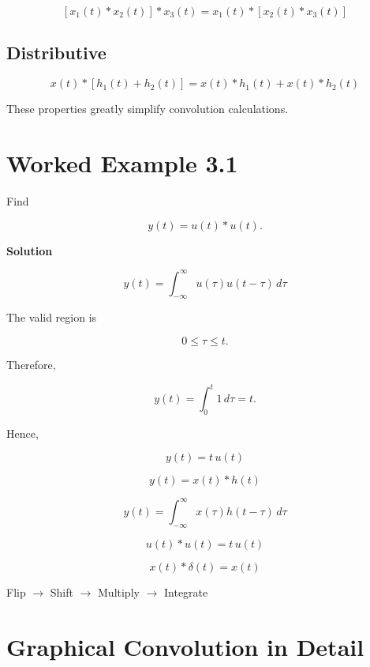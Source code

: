 \[
\boxed{
[x_1(t)*x_2(t)]*x_3(t)
=
x_1(t)*[x_2(t)*x_3(t)]
}
\]


\subsection{Distributive}

\[
\boxed{
x(t)*[h_1(t)+h_2(t)]
=
x(t)*h_1(t)+x(t)*h_2(t)
}
\]

These properties greatly simplify convolution calculations.


\section{Worked Example 3.1}

Find

\[
y(t)=u(t)*u(t).
\]

\textbf{Solution}

\[
y(t)=\int_{-\infty}^{\infty}u(\tau)u(t-\tau)\,d\tau
\]

The valid region is

\[
0\le\tau\le t.
\]

Therefore,

\[
y(t)=\int_0^t 1\,d\tau=t.
\]

Hence,

\[
\boxed{
y(t)=t\,u(t)
}
\]


\begin{tcolorbox}[title=Quick Recall,colback=yellow!10]

\[
y(t)=x(t)*h(t)
\]

\[
y(t)=\int_{-\infty}^{\infty}x(\tau)h(t-\tau)\,d\tau
\]

\[
u(t)*u(t)=t\,u(t)
\]

\[
x(t)*\delta(t)=x(t)
\]

Flip \(\rightarrow\) Shift \(\rightarrow\) Multiply \(\rightarrow\) Integrate

\end{tcolorbox}
\section{Graphical Convolution in Detail}

